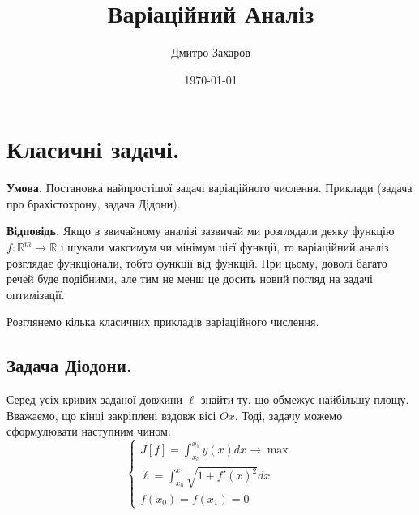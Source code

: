 \documentclass[14pt]{extarticle}
\title{\huge\sffamily\bfseries Варіаційний Аналіз}
\author{\Large\sffamily Дмитро Захаров}
\date{\sffamily \today}
\newcommand{\<}{\langle}
\renewcommand{\>}{\rangle}
\theoremstyle{mystyle}{\newtheorem{definition}{Definition}[section]}
\theoremstyle{mystyle}{\newtheorem{proposition}[definition]{Proposition}}
\theoremstyle{mystyle}{\newtheorem{theorem}[definition]{Theorem}}
\theoremstyle{mystyle}{\newtheorem{lemma}[definition]{Lemma}}
\theoremstyle{mystyle}{\newtheorem{corollary}[definition]{Corollary}}
\theoremstyle{mystyle}{\newtheorem*{remark}{Remark}}
\theoremstyle{mystyle}{\newtheorem*{remarks}{Remarks}}
\theoremstyle{mystyle}{\newtheorem*{example}{Example}}
\theoremstyle{mystyle}{\newtheorem*{examples}{Examples}}
\theoremstyle{definition}{\newtheorem*{exercise}{Exercise}}
\theoremstyle{cstyle}{\newtheorem*{cthm}{}}
\theoremstyle{warn}
\begin{document}
\maketitle


\begin{tcolorbox}[title=Вміст, fonttitle=\sffamily\bfseries\selectfont,interior style={left color=contcol1!40!white,right color=contcol2!40!white},frame style={left color=contcol1!80!white,right color=contcol2!80!white},coltitle=black,top=2mm,bottom=2mm,left=2mm,right=2mm,drop fuzzy shadow,enhanced,breakable]
\makeatletter
{}
\makeatother
\end{tcolorbox}

\newpage

\section{Класичні задачі.}

\textbf{Умова.} Постановка найпростішої задачі варіаційного числення. Приклади (задача про брахістохрону, задача Дідони).

\textbf{Відповідь.} Якщо в звичайному аналізі зазвичай ми розглядали деяку функцію $f: \mathbb{R}^m \to \mathbb{R}$ і шукали максимум 
чи мінімум цієї функції, то варіаційний аналіз розглядає функціонали, тобто функції від функцій. При цьому, доволі багато
речей буде подібними, але тим не менш це досить новий погляд на задачі оптимізації.

Розглянемо кілька класичних прикладів варіаційного числення. 

\subsection{Задача Діодони.}
Серед усіх кривих заданої довжини $\ell$ знайти ту, що
обмежує найбільшу площу. Вважаємо, що кінці закріплені вздовж вісі $Ox$. Тоді, задачу можемо 
сформулювати наступним чином:
\begin{equation}
    \begin{cases}
        J[f] = \int_{x_0}^{x_1}y(x)dx \to \max \\
        \ell = \int_{x_0}^{x_1}\sqrt{1+f'(x)^2}dx \\
        f(x_0) = f(x_1) = 0
    \end{cases}
\end{equation} 
\end{document}

